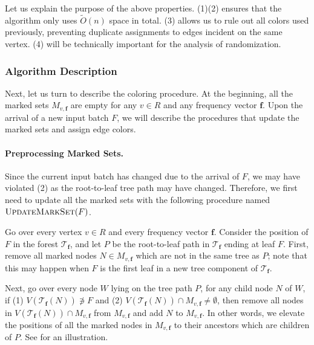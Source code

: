 \documentclass[11pt,a4paper]{article}
\newcommand{\tree}{\mathcal{T}}
\newcommand{\freq}{\mathbf{f}}
\begin{document}
Let us explain the purpose of the above properties. (1)(2) ensures that the algorithm only uses $\tilde{O}(n)$ space in total. (3) allows us to rule out all colors used previously, preventing duplicate assignments to edges incident on the same vertex. (4) will be technically important for the analysis of randomization. 

\subsubsection{Algorithm Description}\label{rand-alg}
Next, let us turn to describe the coloring procedure. At the beginning, all the marked sets $M_{v, \freq}$ are empty for any $v\in R$ and any frequency vector $\freq$. Upon the arrival of a new input batch $F$, we will describe the procedures that update the marked sets and assign edge colors.

\paragraph*{Preprocessing Marked Sets.} Since the current input batch has changed due to the arrival of $F$, we may have violated (2) as the root-to-leaf tree path may have changed. Therefore, we first need to update all the marked sets with the following procedure named $\textsc{UpdateMarkSet}(F)$\label{alg:UpdateMarkSet}.

Go over every vertex $v\in R$ and every frequency vector $\freq$. Consider the position of $F$ in the forest $\tree_\freq$, and let $P$ be the root-to-leaf path in $\tree_{\freq}$ ending at leaf $F$. First, remove all marked nodes $N\in M_{v, \freq}$ which are not in the same tree as $P$; note that this may happen when $F$ is the first leaf in a new tree component of $\tree_{\freq}$.

Next, go over every node $W$ lying on the tree path $P$, for any child node $N$ of $W$, if (1) $V(\tree_\freq(N)) \not\ni F$ and (2) $V(\tree_\freq(N))\cap M_{v, \freq} \neq \emptyset$, then remove all nodes in $V(\tree_\freq(N))\cap M_{v, \freq}$ from $M_{v, \freq}$ and add $N$ to $M_{v, \freq}$. In other words, we elevate the positions of all the marked nodes in $M_{v, \freq}$ to their ancestors which are children of $P$. See  for an illustration.
\end{document}
